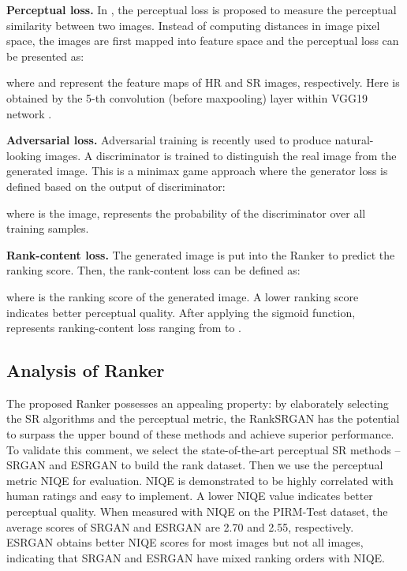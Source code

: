 \documentclass[10pt,twocolumn,letterpaper]{article}
\begin{document}
\textbf{Perceptual loss.} In \cite{dosovitskiy2016generating,johnson2016perceptual}, the perceptual loss is proposed to measure the perceptual similarity between two images. Instead of computing distances in image pixel space, the images are first mapped into feature space and the perceptual loss can be presented as:
\begin{small}

\end{small}where  and  represent the feature maps of HR and SR images, respectively. Here  is obtained by the 5-th convolution (before maxpooling) layer within VGG19 network \cite{simonyan2014very}.

\textbf{Adversarial loss.} Adversarial training \cite{ledig2017photo,sajjadi2017enhancenet} is recently used to produce natural-looking images. A discriminator is trained to distinguish the real image from the generated image. This is a minimax game approach where the generator loss  is defined based on the output of discriminator:
\begin{small}

\end{small}where  is the  image,  represents the probability of the discriminator over all training samples.

\textbf{Rank-content loss.} The generated image is put into the Ranker to predict the ranking score. Then, the rank-content loss can  be defined as:

where  is the ranking score of the generated image. A lower ranking score indicates better perceptual quality. After applying the sigmoid function,  represents ranking-content loss ranging from  to .


\subsection{Analysis of Ranker}
\label{3.4}
The proposed Ranker possesses an appealing property: by elaborately selecting the SR algorithms and the perceptual metric, the RankSRGAN has the potential to surpass the upper bound of these methods and achieve superior performance. To validate this comment, we select the state-of-the-art perceptual SR methods -- SRGAN \cite{ledig2017photo} and ESRGAN \cite{Wang_2018_ECCV_Workshops} to build the rank dataset.  Then we use the perceptual metric NIQE \cite{mittal2013making} for evaluation. NIQE is demonstrated to be highly correlated with human ratings and easy to implement. A lower NIQE value indicates better perceptual quality. When measured with NIQE on the PIRM-Test \cite{blau20182018} dataset, the average scores of SRGAN and ESRGAN are 2.70 and 2.55, respectively. ESRGAN obtains better NIQE scores for most images but not all images, indicating that SRGAN and ESRGAN have mixed ranking orders with NIQE.
\end{document}
